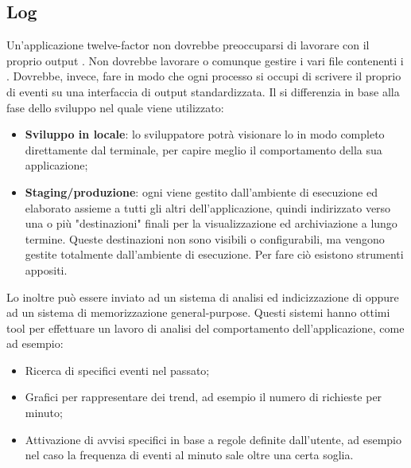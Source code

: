 \documentclass[PianoDiQualifica.tex]{subfiles}
\begin{document}
\subsection{Log}
Un'applicazione twelve-factor non dovrebbe preoccuparsi di lavorare con il proprio output . Non dovrebbe lavorare o comunque gestire i vari file contenenti i . Dovrebbe, invece, fare in modo che ogni processo si occupi di scrivere il proprio  di eventi su una interfaccia di output standardizzata.
Il  si differenzia in base alla fase dello sviluppo nel quale viene utilizzato:
\begin{itemize}
\item \textbf{Sviluppo in locale}: lo sviluppatore potrà visionare lo  in modo completo direttamente dal terminale, per capire meglio il comportamento della sua applicazione;
\item \textbf{Staging/produzione}: ogni  viene gestito dall'ambiente di esecuzione ed elaborato assieme a tutti gli altri  dell'applicazione, quindi indirizzato verso una o più "destinazioni" finali per la visualizzazione ed archiviazione a lungo termine. Queste destinazioni non sono visibili o configurabili, ma vengono gestite totalmente dall'ambiente di esecuzione. Per fare ciò esistono strumenti appositi.
\end{itemize}
Lo  inoltre può essere inviato ad un sistema di analisi ed indicizzazione di  oppure ad un sistema di memorizzazione general-purpose. Questi sistemi hanno ottimi tool per effettuare un lavoro di analisi del comportamento dell'applicazione, come ad esempio:
\begin{itemize}
\item Ricerca di specifici eventi nel passato;
\item Grafici per rappresentare dei trend, ad esempio il numero di richieste per minuto;
\item Attivazione di avvisi specifici in base a regole definite dall'utente, ad esempio nel caso la frequenza di eventi al minuto sale oltre una certa soglia.
\end{itemize}
\end{document}
